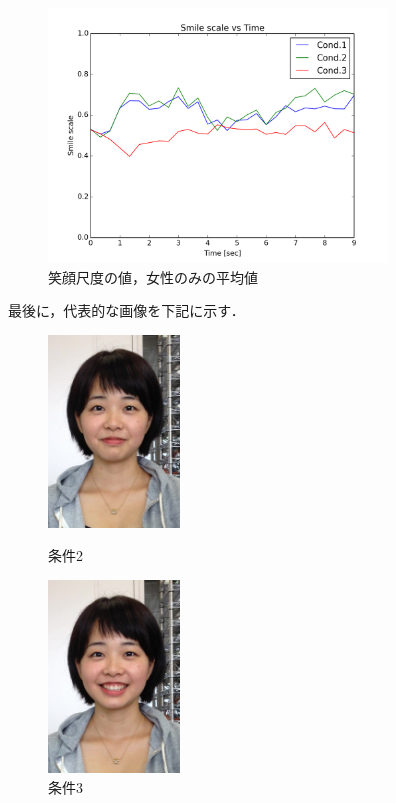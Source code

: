 \documentclass[submit,techreq]{ec2014}
\begin{document}
\begin{figure}[h!]
  \centering  
\includegraphics[width=90mm, bb=0 0 600 450]{images/smooth5_avg_gender_1.png}
\caption{笑顔尺度の値，女性のみの平均値}
  \label{graph-gender}
\end{figure}



最後に，代表的な画像を下記に示す．

\begin{figure}[h]
\begin{minipage}{0.49\columnwidth}
\begin{center}
\includegraphics[width=35mm, bb=0 0 572 834]{images/cap_28.jpg}
\caption{条件2}
\end{center}
\end{minipage}
\begin{minipage}{0.49\columnwidth}
\begin{center}
\includegraphics[width=35mm, bb=0 0 572 834]{images/cap_123.jpg}
\caption{条件3}
\end{center}
\end{minipage}
\end{figure}
\end{document}
